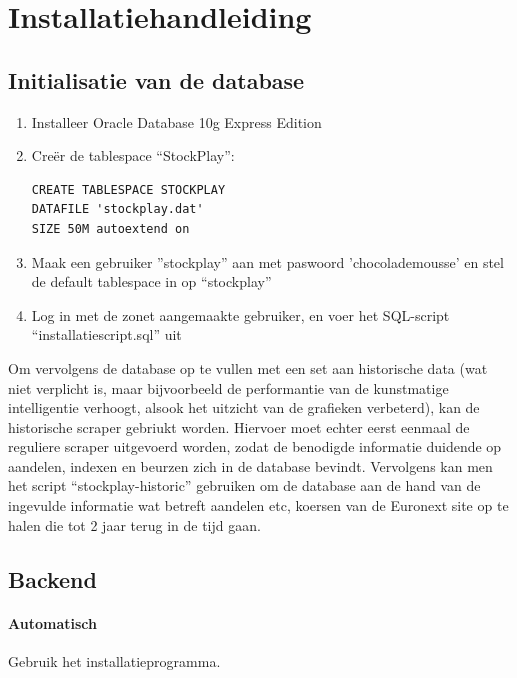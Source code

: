 %
%

\section{Installatiehandleiding}

\subsection{Initialisatie van de database}

\begin{enumerate}
\item{Installeer Oracle Database 10g Express Edition}
\item{Cre\"er de tablespace ``StockPlay'':
\begin{verbatim}
CREATE TABLESPACE STOCKPLAY 
DATAFILE 'stockplay.dat' 
SIZE 50M autoextend on
\end{verbatim}
}
\item{Maak een gebruiker ''stockplay'' aan met paswoord 'chocolademousse' en stel de default tablespace in op ``stockplay''}
\item{Log in met de zonet aangemaakte gebruiker, en voer het SQL-script ``installatiescript.sql'' uit}
\end{enumerate}

Om vervolgens de database op te vullen met een set aan historische data (wat niet verplicht is, maar bijvoorbeeld de performantie van de kunstmatige intelligentie verhoogt, alsook het uitzicht van de grafieken verbeterd), kan de historische scraper gebriukt worden. Hiervoer moet echter eerst eenmaal de reguliere scraper uitgevoerd worden, zodat de benodigde informatie duidende op aandelen, indexen en beurzen zich in de database bevindt. Vervolgens kan men het script ``stockplay-historic'' gebruiken om de database aan de hand van de ingevulde informatie wat betreft aandelen etc, koersen van de Euronext site op te halen die tot 2 jaar terug in de tijd gaan.


\subsection{Backend}

\paragraph{Automatisch} Gebruik het installatieprogramma.

